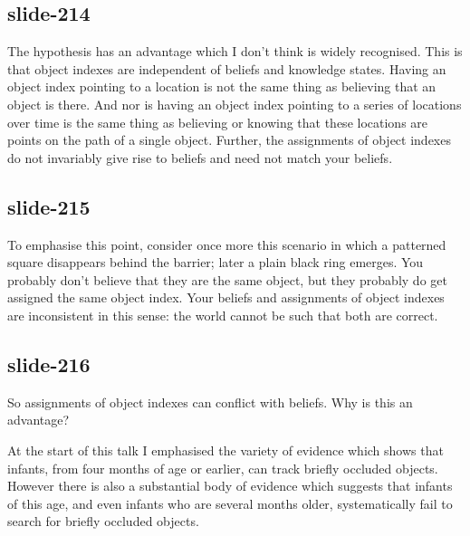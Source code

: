 \documentclass[12pt,\papersize]{extarticle}
\begin{document}
\subsection{slide-214}
The hypothesis has an advantage which I don’t think is widely
recognised.
This is that object indexes are independent of beliefs and knowledge
states.
Having an object index pointing to a location is not the same thing
as believing that an object is there.
And nor is having an object index pointing to a series of locations over time
is the same thing as believing or knowing that these locations
are points on the path of a single object.
Further, the assignments of object indexes do not invariably give rise
to beliefs and need not match your beliefs.

\subsection{slide-215}
To emphasise this point, consider once more this scenario
in which a patterned square disappears behind the barrier; later a
plain black ring emerges.  You probably don't believe that they are
the same object, but they probably do get assigned the same object index.
Your beliefs and assignments of object indexes are inconsistent in this
sense: the world cannot be such that both are correct.

\subsection{slide-216}
So assignments of object indexes can conflict with beliefs.
Why is this an advantage?

At the start of this talk I emphasised the variety of evidence
which shows that infants, from four months of age or earlier,
can track briefly occluded objects.
However there is also a substantial body of evidence which suggests that
infants of this age, and even infants who are several months older,
systematically fail to search for briefly occluded objects.
\end{document}
